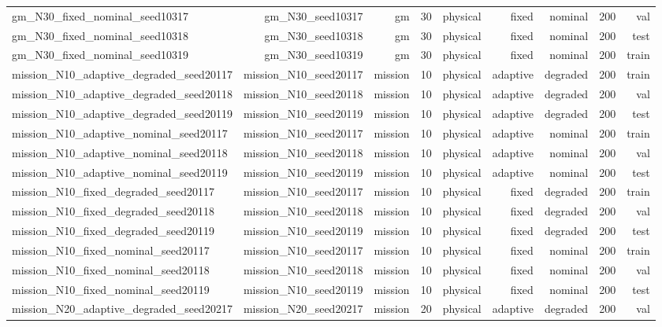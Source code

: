 \begin{tabular}{lrrrrrrrr}
gm\_N30\_fixed\_nominal\_seed10317 & gm\_N30\_seed10317 & gm & 30 & physical & fixed & nominal & 200 & val \\
gm\_N30\_fixed\_nominal\_seed10318 & gm\_N30\_seed10318 & gm & 30 & physical & fixed & nominal & 200 & test \\
gm\_N30\_fixed\_nominal\_seed10319 & gm\_N30\_seed10319 & gm & 30 & physical & fixed & nominal & 200 & train \\
mission\_N10\_adaptive\_degraded\_seed20117 & mission\_N10\_seed20117 & mission & 10 & physical & adaptive & degraded & 200 & train \\
mission\_N10\_adaptive\_degraded\_seed20118 & mission\_N10\_seed20118 & mission & 10 & physical & adaptive & degraded & 200 & val \\
mission\_N10\_adaptive\_degraded\_seed20119 & mission\_N10\_seed20119 & mission & 10 & physical & adaptive & degraded & 200 & test \\
mission\_N10\_adaptive\_nominal\_seed20117 & mission\_N10\_seed20117 & mission & 10 & physical & adaptive & nominal & 200 & train \\
mission\_N10\_adaptive\_nominal\_seed20118 & mission\_N10\_seed20118 & mission & 10 & physical & adaptive & nominal & 200 & val \\
mission\_N10\_adaptive\_nominal\_seed20119 & mission\_N10\_seed20119 & mission & 10 & physical & adaptive & nominal & 200 & test \\
mission\_N10\_fixed\_degraded\_seed20117 & mission\_N10\_seed20117 & mission & 10 & physical & fixed & degraded & 200 & train \\
mission\_N10\_fixed\_degraded\_seed20118 & mission\_N10\_seed20118 & mission & 10 & physical & fixed & degraded & 200 & val \\
mission\_N10\_fixed\_degraded\_seed20119 & mission\_N10\_seed20119 & mission & 10 & physical & fixed & degraded & 200 & test \\
mission\_N10\_fixed\_nominal\_seed20117 & mission\_N10\_seed20117 & mission & 10 & physical & fixed & nominal & 200 & train \\
mission\_N10\_fixed\_nominal\_seed20118 & mission\_N10\_seed20118 & mission & 10 & physical & fixed & nominal & 200 & val \\
mission\_N10\_fixed\_nominal\_seed20119 & mission\_N10\_seed20119 & mission & 10 & physical & fixed & nominal & 200 & test \\
mission\_N20\_adaptive\_degraded\_seed20217 & mission\_N20\_seed20217 & mission & 20 & physical & adaptive & degraded & 200 & val \\

\end{tabular}
